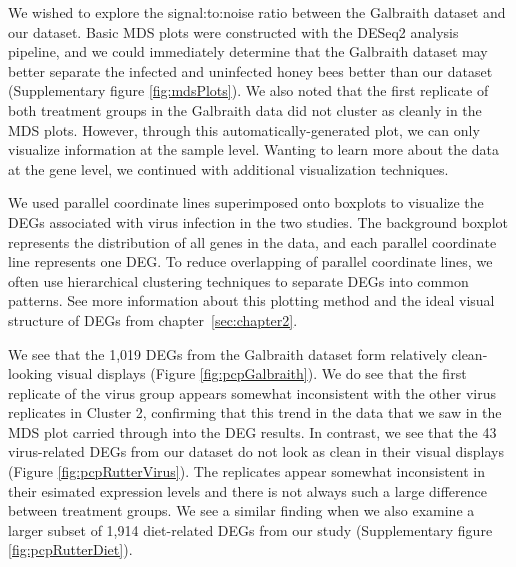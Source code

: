 \documentclass[11pt,a4paper,oldfontcommands,openany]{memoir}
\numberwithin{equation}{section} %
\begin{document}
We wished to explore the signal:to:noise ratio between the Galbraith dataset and our dataset. Basic MDS plots were constructed with the DESeq2 analysis pipeline, and we could immediately determine that the Galbraith dataset may better separate the infected and uninfected honey bees better than our dataset (Supplementary figure \ref{fig:mdsPlots}). We also noted that the first replicate of both treatment groups in the Galbraith data did not cluster as cleanly in the MDS plots. However, through this automatically-generated plot, we can only visualize information at the sample level. Wanting to learn more about the data at the gene level, we continued with additional visualization techniques.

We used parallel coordinate lines superimposed onto boxplots to visualize the DEGs associated with virus infection in the two studies. The background boxplot represents the distribution of all genes in the data, and each parallel coordinate line represents one DEG. To reduce overlapping of parallel coordinate lines, we often use hierarchical clustering techniques to separate DEGs into common patterns. See more information about this plotting method and the ideal visual structure of DEGs from chapter~\ref{sec:chapter2}.

We see that the 1,019 DEGs from the Galbraith dataset form relatively clean-looking visual displays (Figure \ref{fig:pcpGalbraith}). We do see that the first replicate of the virus group appears somewhat inconsistent with the other virus replicates in Cluster 2, confirming that this trend in the data that we saw in the MDS plot carried through into the DEG results. In contrast, we see that the 43 virus-related DEGs from our dataset do not look as clean in their visual displays (Figure \ref{fig:pcpRutterVirus}). The replicates appear somewhat inconsistent in their esimated expression levels and there is not always such a large difference between treatment groups. We see a similar finding when we also examine a larger subset of 1,914 diet-related DEGs from our study (Supplementary figure \ref{fig:pcpRutterDiet}). 
\end{document}
